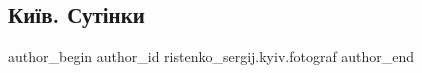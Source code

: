  
 
 
 
 

\subsection{Київ. Сутінки}
\label{sec:20_11_2022.fb.ristenko_sergij.kyiv.fotograf.1.ki_v__sut_nki}

\ifcmt
 author_begin
   author_id ristenko_sergij.kyiv.fotograf
 author_end
\fi
